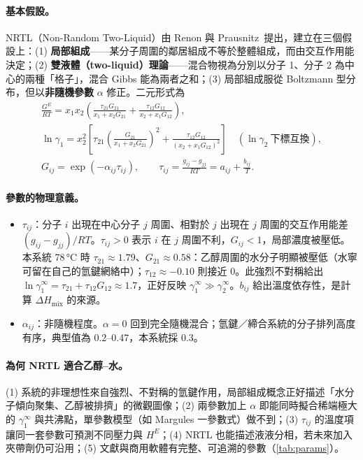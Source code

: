 \documentclass[UTF8,a4paper,11pt,fontset=none,zihao=-4]{ctexart}
\numberwithin{equation}{section}\renewcommand{\theequation}{\arabic{section}.\arabic{equation}}
\numberwithin{figure}{section}\renewcommand{\thefigure}{\arabic{section}.\arabic{figure}}
\numberwithin{table}{section}\renewcommand{\thetable}{\arabic{section}.\arabic{table}}
\begin{document}
\paragraph{基本假設。}NRTL（Non-Random Two-Liquid）由 Renon 與 Prausnitz\,\cite{nrtl} 提出，建立在三個假設上：(1) \textbf{局部組成}——某分子周圍的鄰居組成不等於整體組成，而由交互作用能決定；(2) \textbf{雙液體（two-liquid）理論}——混合物視為分別以分子 1、分子 2 為中心的兩種「格子」，混合 Gibbs 能為兩者之和；(3) 局部組成服從 Boltzmann 型分布，但以\textbf{非隨機參數} $\alpha$ 修正。二元形式為
\begin{gather}
\frac{G^E}{RT}=x_1x_2\left(\frac{\tau_{21}G_{21}}{x_1+x_2G_{21}}+\frac{\tau_{12}G_{12}}{x_2+x_1G_{12}}\right),\\
\ln\gamma_1=x_2^{2}\left[\tau_{21}\left(\frac{G_{21}}{x_1+x_2G_{21}}\right)^{2}+\frac{\tau_{12}G_{12}}{(x_2+x_1G_{12})^{2}}\right]\quad(\ln\gamma_2\ \text{下標互換}),\\
G_{ij}=\exp(-\alpha_{ij}\tau_{ij}),\qquad \tau_{ij}=\frac{g_{ij}-g_{jj}}{RT}=a_{ij}+\frac{b_{ij}}{T}. \label{eq:tau}
\end{gather}

\paragraph{參數的物理意義。}
\begin{itemize}
\item $\tau_{ij}$：分子 $i$ 出現在中心分子 $j$ 周圍、相對於 $j$ 出現在 $j$ 周圍的交互作用能差 $(g_{ij}-g_{jj})/RT$。$\tau_{ij}>0$ 表示 $i$ 在 $j$ 周圍不利，$G_{ij}<1$，局部濃度被壓低。本系統 78\,°C 時 $\tau_{21}\approx1.79$、$G_{21}\approx0.58$：乙醇周圍的水分子明顯被壓低（水寧可留在自己的氫鍵網絡中）；$\tau_{12}\approx-0.10$ 則接近 0。此強烈不對稱給出 $\ln\gamma_1^\infty=\tau_{21}+\tau_{12}G_{12}\approx1.7$，正好反映 $\gamma_1^\infty\gg\gamma_2^\infty$。$b_{ij}$ 給出溫度依存性，是計算 $\Delta H_{\mathrm{mix}}$ 的來源。
\item $\alpha_{ij}$：非隨機程度。$\alpha=0$ 回到完全隨機混合；氫鍵／締合系統的分子排列高度有序，典型值為 0.2--0.47，本系統採 0.3。
\end{itemize}

\paragraph{為何 NRTL 適合乙醇--水。}(1) 系統的非理想性來自強烈、不對稱的氫鍵作用，局部組成概念正好描述「水分子傾向聚集、乙醇被排擠」的微觀圖像；(2) 兩參數加上 $\alpha$ 即能同時擬合稀端極大的 $\gamma_1^\infty$ 與共沸點，單參數模型（如 Margules 一參數式）做不到；(3) $\tau_{ij}$ 的溫度項讓同一套參數可預測不同壓力與 $H^E$；(4) NRTL 也能描述液液分相，若未來加入夾帶劑仍可沿用；(5) 文獻與商用軟體有完整、可追溯的參數（\cref{tab:params}）。
\end{document}
